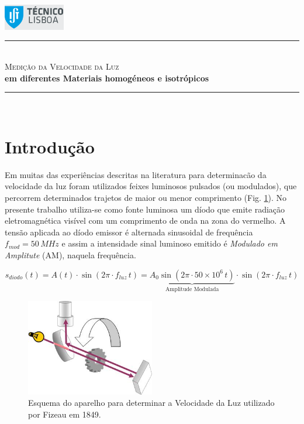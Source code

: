 \documentclass[a4paper,12pt]{article}      %
\author{Prof. Bernardo B. Carvalho}
\date{ Outubro 2012}
\newcommand{\HRule}{\rule{\linewidth}{0.5mm}}
\begin{document}
 

	\includegraphics[width=0.2\textwidth]{../logo-ist}%

	\HRule \\[0.5cm]
	{ \huge \sf  \textsc{Medição da Velocidade da Luz} }\\[0.4cm] %
	{ \large \bfseries em diferentes Materiais homogéneos e isotrópicos}\\
	\HRule \\%


\section{\sf Introdução}
Em muitas das experiências descritas na literatura para
determinacão da velocidade da luz foram utilizados feixes luminosos
pulsados (ou modulados), que percorrem determinados trajetos de maior ou menor
comprimento (Fig. \ref{fig:Fizeau}). 
No presente trabalho utiliza-se como fonte luminosa um díodo que
emite radiação eletromagnética visível com um comprimento de onda na
zona do vermelho. A tensão aplicada ao díodo emissor é alternada
sinusoidal de frequência $f_{mod}=50\,MHz$ e  assim a intensidade sinal luminoso
 emitido é \emph{Modulado em Amplitute} (AM), naquela frequência. 

\begin{equation*}
	\label{eq:f_am}
		s_{diodo}(t) = A(t) \cdot \sin ( 2\pi \cdot f_{luz} \, t) = \underbrace{A_0 \sin ( 2\pi \cdot 50\times 10^6 \, t)}_\text{Amplitude Modulada} \cdot \sin ( 2\pi \cdot f_{luz} \, t)
\end{equation*}

\begin{figure}
	[ht!b]  \centering 
	\includegraphics[width=0.5\textwidth]{Fizeau}
	\caption{Esquema do aparelho para determinar a Velocidade da Luz utilizado por Fizeau em 1849. \label{fig:Fizeau}} 
\end{figure}
\end{document}
